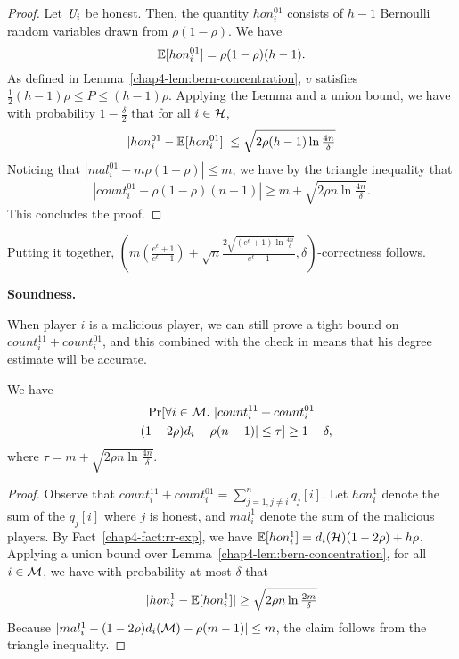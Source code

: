 \begin{proof}
Let $\textit{U}_i$ be honest. Then, the quantity $hon_i^{01}$ consists of $h-1$ Bernoulli random variables drawn from $\rho(1-\rho)$. We have
\[
    \operatorname{\mathbb{E}}[hon_i^{01}] = \rho(1-\rho)(h-1).
\]
 As defined in Lemma~\ref{chap4-lem:bern-concentration}, $v$ satisfies $\frac{1}{2}(h-1)\rho \leq P \leq (h-1)\rho$.
Applying the Lemma and a union bound, we have with probability $1-\frac{\delta}{2}$ that for all $i \in \mathcal{H}$, 
\begin{equation}\label{chap4-eq:hon-player-bits-2}
    |hon_i^{01} - \operatorname{\mathbb{E}}[hon_i^{01}]| \leq \sqrt{2\rho (h-1) \ln \tfrac{4n}{\delta}}
\end{equation}
Noticing that $|mal_i^{01} - m \rho(1-\rho)| \leq m$, we have by the triangle inequality that
\[
    |count_i^{01} - \rho(1-\rho)(n-1)| \geq m + \sqrt{2\rho n \ln \tfrac{4n}{\delta}}.
\]
This concludes the proof.
\end{proof}
Putting it together,
$\left( m (\frac{e^\epsilon+1}{e^{\epsilon}-1}) + \sqrt{n}\frac{2 \sqrt{(e^\epsilon+1)\ln \frac{4n}{\delta}}}{e^\epsilon-1}, \delta\right)$-correctness follows.

\noindent \textbf{Soundness.} 

When player $i$ is a malicious player, we can still prove a tight bound on $count_{i}^{11} + count_{i}^{01}$, and this combined with the check in \DegRRNaive{} means that his degree estimate will be accurate.

\begin{claim}\label{chap4-claim:mal-response-concentration}
We have
\begin{multline*}
    \Pr[\forall i \in \mathcal{M}.~|count_i^{11} + count_i^{01} \\ 
			-(1-2\rho)d_i - \rho(n-1)| \leq \tau ] \geq 1-\delta,
\end{multline*}
where $\tau = m + \sqrt{2 \rho n \ln \frac{4 n}{\delta}}$.
\end{claim}
\begin{proof}
Observe that $count_i^{11} + count_i^{01} = \sum_{j=1, j\neq i}^n q_{j}[i]$. Let $hon_i^{1}$ denote the sum of the $q_{j}[i]$ where $j$ is honest, and $mal_i^{1}$ denote the sum of the malicious players. By Fact~\ref{chap4-fact:rr-exp}, we have $\operatorname{\mathbb{E}}[hon_i^1] = d_i(\mathcal{H}) (1-2\rho) + h \rho$. Applying a union bound over Lemma~\ref{chap4-lem:bern-concentration}, for all $i \in \mathcal{M}$, we have with probability at most $\delta$ that
\begin{equation}\label{chap4-eq:good-event-3}
    |hon_i^1 - \operatorname{\mathbb{E}}[hon_i^1]| \geq \sqrt{2\rho n \ln \tfrac{2m}{\delta}}
\end{equation}
Because $|mal_i^1 - (1-2\rho)d_i(\mathcal{M}) - \rho (m-1)| \leq m$, the claim follows from the triangle inequality.
\end{proof}

